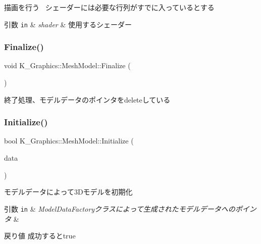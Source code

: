 描画を行う~\newline
シェーダーには必要な行列がすでに入っているとする 


\begin{DoxyParams}[1]{引数}
\mbox{\tt in}  & {\em shader} & 使用するシェーダー \\
\hline
\end{DoxyParams}
\mbox{\label{class_k___graphics_1_1_mesh_model_a22ec15af1fc136d17ef87293acc1e4a7}} 
\subsubsection{\texorpdfstring{Finalize()}{Finalize()}}
{\footnotesize\ttfamily void K\+\_\+\+Graphics\+::\+Mesh\+Model\+::\+Finalize (\begin{DoxyParamCaption}{ }\end{DoxyParamCaption})}



終了処理、モデルデータのポインタをdeleteしている 

\mbox{\label{class_k___graphics_1_1_mesh_model_a637186b0c2c238605024c1ac04b74fa5}} 
\subsubsection{\texorpdfstring{Initialize()}{Initialize()}}
{\footnotesize\ttfamily bool K\+\_\+\+Graphics\+::\+Mesh\+Model\+::\+Initialize (\begin{DoxyParamCaption}\item[{\mbox{\hyperlink{struct_k___graphics_1_1_model_datas}{Model\+Datas}} $\ast$}]{data }\end{DoxyParamCaption})}



モデルデータによって3\+Dモデルを初期化 


\begin{DoxyParams}[1]{引数}
\mbox{\tt in}  & {\em Model\+Data\+Factoryクラスによって生成されたモデルデータへのポインタ} & \\
\hline
\end{DoxyParams}
\begin{DoxyReturn}{戻り値}
成功するとtrue 
\end{DoxyReturn}
\mbox{\label{class_k___graphics_1_1_mesh_model_ad6da27db2ea78c8b7b531707973d33f1}} 
